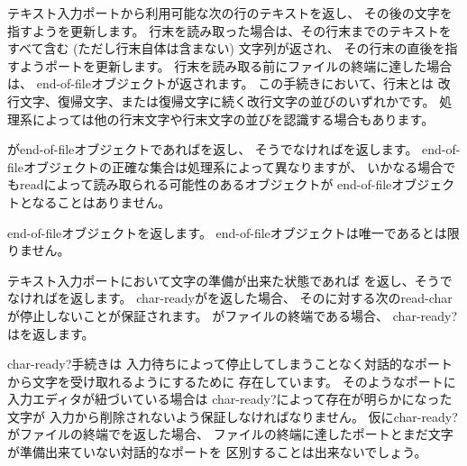 \begin{entry}{%
}

テキスト入力ポートから利用可能な次の行のテキストを返し、
その後の文字を指すようを更新します。
行末を読み取った場合は、その行末までのテキストをすべて含む
(ただし行末自体は含まない) 文字列が返され、
その行末の直後を指すようポートを更新します。
行末を読み取る前にファイルの終端に達した場合は、
end-of-fileオブジェクトが返されます。
この手続きにおいて、行末とは
改行文字、復帰文字、または復帰文字に続く改行文字の並びのいずれかです。
処理系によっては他の行末文字や行末文字の並びを認識する場合もあります。

\end{entry}


\begin{entry}{%
}

がend-of-fileオブジェクトであれば\schtrue{}を返し、
そうでなければ\schfalse{}を返します。
end-of-fileオブジェクトの正確な集合は処理系によって異なりますが、
いかなる場合でも{\cf read}によって読み取られる可能性のあるオブジェクトが
end-of-fileオブジェクトとなることはありません。

\end{entry}

\begin{entry}{%
}

end-of-fileオブジェクトを返します。
end-of-fileオブジェクトは唯一であるとは限りません。

\end{entry}


\begin{entry}{%
}

テキスト入力ポートにおいて文字の準備が出来た状態であれば
\schtrue{}を返し、そうでなければ\schfalse{}を返します。
{\cf char-ready}が\schtrue{}を返した場合、
そのに対する次の{\cf read-char}が停止しないことが保証されます。
がファイルの終端である場合、
{\cf char-ready?}は\schtrue{}を返します。

\begin{rationale}
{\cf char-ready?}手続きは
入力待ちによって停止してしまうことなく対話的なポートから文字を受け取れるようにするために
存在しています。
そのようなポートに入力エディタが紐づいている場合は
{\cf char-ready?}によって存在が明らかになった文字が
入力から削除されないよう保証しなければなりません。
仮に{\cf char-ready?}がファイルの終端で\schfalse{}を返した場合、
ファイルの終端に達したポートとまだ文字が準備出来ていない対話的なポートを
区別することは出来ないでしょう。
\end{rationale}
\end{entry}

